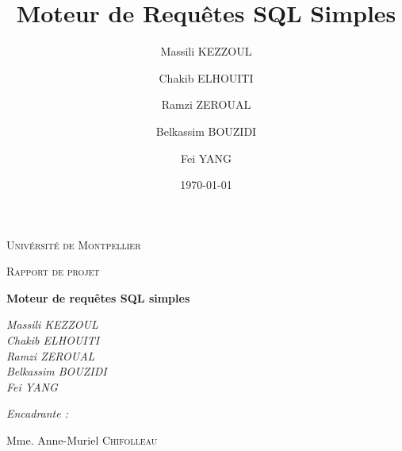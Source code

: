 \documentclass[oneside,13pt,a4paper]{report}
\title{Moteur de Requêtes SQL Simples}
\author{
    Massili KEZZOUL \and
    Chakib ELHOUITI \and
    Ramzi ZEROUAL \and
    Belkassim BOUZIDI \and
    Fei YANG
}
\date{\today}
\begin{document}
    \begin{titlepage}
        \centering
        {\scshape\LARGE Univérsité de Montpellier\par}
        {\scshape\Large Rapport de projet\par}
        \vspace{1.5cm}
        {\huge\bfseries Moteur de requêtes SQL simples\par}
        \vspace{2cm}
        {\Large\itshape
            Massili KEZZOUL \\
            Chakib ELHOUITI \\
            Ramzi ZEROUAL \\
            Belkassim BOUZIDI \\
            Fei YANG \\
        \par}

        \vspace{1.5cm}

        {\Large\itshape
            Encadrante :\par
            Mme. Anne-Muriel \textsc{Chifolleau}
        \par}

        \vspace{2cm}


\end{titlepage}
\end{document}
